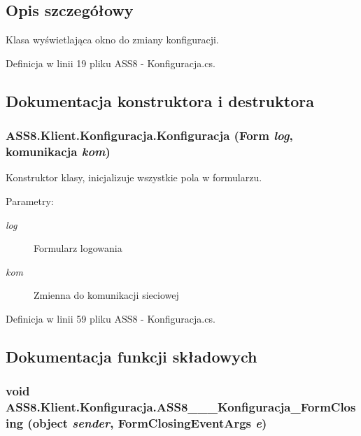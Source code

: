 \subsection{Opis szczegółowy}
Klasa wyświetlająca okno do zmiany konfiguracji. 



Definicja w linii 19 pliku ASS8 - Konfiguracja.cs.

\subsection{Dokumentacja konstruktora i destruktora}
\hypertarget{a00014_b298e3bc6d95ff4bb409a69a84598ea6}{
\subsubsection[{Konfiguracja}]{\setlength{\rightskip}{0pt plus 5cm}ASS8.Klient.Konfiguracja.Konfiguracja (Form {\em log}, \/  {\bf komunikacja} {\em kom})}}
\label{d2/de7/a00014_b298e3bc6d95ff4bb409a69a84598ea6}


Konstruktor klasy, inicjalizuje wszystkie pola w formularzu. 

\begin{Desc}
\item[Parametry:]
\begin{description}
\item[{\em log}]Formularz logowania\item[{\em kom}]Zmienna do komunikacji sieciowej\end{description}
\end{Desc}


Definicja w linii 59 pliku ASS8 - Konfiguracja.cs.

\subsection{Dokumentacja funkcji składowych}
\hypertarget{a00014_f679b61007ce606b466155103b678d40}{
\subsubsection[{ASS8\_\-\_\-\_\-Konfiguracja\_\-FormClosing}]{\setlength{\rightskip}{0pt plus 5cm}void ASS8.Klient.Konfiguracja.ASS8\_\-\_\-\_\-Konfiguracja\_\-FormClosing (object {\em sender}, \/  FormClosingEventArgs {\em e})}}
\label{d2/de7/a00014_f679b61007ce606b466155103b678d40}


